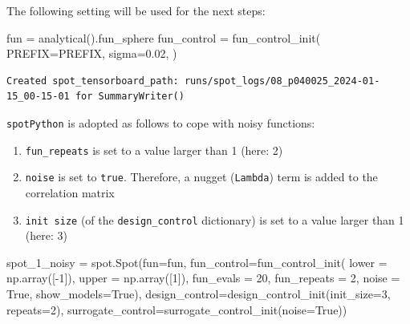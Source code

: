 \documentclass[
  letterpaper,
  DIV=11,
  numbers=noendperiod]{scrreprt}
\newenvironment{Shaded}{\begin{snugshade}}{\end{snugshade}}
\newcommand{\DecValTok}[1]{\textcolor[rgb]{0.68,0.00,0.00}{#1}}
\newcommand{\FloatTok}[1]{\textcolor[rgb]{0.68,0.00,0.00}{#1}}
\newcommand{\NormalTok}[1]{\textcolor[rgb]{0.00,0.23,0.31}{#1}}
\newcommand{\OperatorTok}[1]{\textcolor[rgb]{0.37,0.37,0.37}{#1}}
\newcommand{\VariableTok}[1]{\textcolor[rgb]{0.07,0.07,0.07}{#1}}
\providecommand{\tightlist}{%
  \setlength{\itemsep}{0pt}\setlength{\parskip}{0pt}}\usepackage{longtable,booktabs,array}
\begin{document}
The following setting will be used for the next steps:

\begin{Shaded}
\begin{Highlighting}[]
\NormalTok{fun }\OperatorTok{=}\NormalTok{ analytical().fun\_sphere}
\NormalTok{fun\_control }\OperatorTok{=}\NormalTok{ fun\_control\_init(}
\NormalTok{    PREFIX}\OperatorTok{=}\NormalTok{PREFIX,}
\NormalTok{    sigma}\OperatorTok{=}\FloatTok{0.02}\NormalTok{,}
\NormalTok{)}
\end{Highlighting}
\end{Shaded}

\begin{verbatim}
Created spot_tensorboard_path: runs/spot_logs/08_p040025_2024-01-15_00-15-01 for SummaryWriter()
\end{verbatim}

\texttt{spotPython} is adopted as follows to cope with noisy functions:

\begin{enumerate}
\def\labelenumi{\arabic{enumi}.}
\tightlist
\item
  \texttt{fun\_repeats} is set to a value larger than 1 (here: 2)
\item
  \texttt{noise} is set to \texttt{true}. Therefore, a nugget
  (\texttt{Lambda}) term is added to the correlation matrix
\item
  \texttt{init\ size} (of the \texttt{design\_control} dictionary) is
  set to a value larger than 1 (here: 3)
\end{enumerate}

\begin{Shaded}
\begin{Highlighting}[]
\NormalTok{spot\_1\_noisy }\OperatorTok{=}\NormalTok{ spot.Spot(fun}\OperatorTok{=}\NormalTok{fun,}
\NormalTok{                   fun\_control}\OperatorTok{=}\NormalTok{fun\_control\_init(}
\NormalTok{                                    lower }\OperatorTok{=}\NormalTok{ np.array([}\OperatorTok{{-}}\DecValTok{1}\NormalTok{]),}
\NormalTok{                                    upper }\OperatorTok{=}\NormalTok{ np.array([}\DecValTok{1}\NormalTok{]),}
\NormalTok{                                    fun\_evals }\OperatorTok{=} \DecValTok{20}\NormalTok{,}
\NormalTok{                                    fun\_repeats }\OperatorTok{=} \DecValTok{2}\NormalTok{,}
\NormalTok{                                    noise }\OperatorTok{=} \VariableTok{True}\NormalTok{,}
\NormalTok{                                    show\_models}\OperatorTok{=}\VariableTok{True}\NormalTok{),}
\NormalTok{                   design\_control}\OperatorTok{=}\NormalTok{design\_control\_init(init\_size}\OperatorTok{=}\DecValTok{3}\NormalTok{, repeats}\OperatorTok{=}\DecValTok{2}\NormalTok{),}
\NormalTok{                   surrogate\_control}\OperatorTok{=}\NormalTok{surrogate\_control\_init(noise}\OperatorTok{=}\VariableTok{True}\NormalTok{))}
\end{Highlighting}
\end{Shaded}
\end{document}

